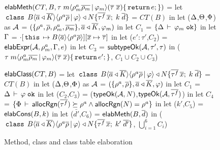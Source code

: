 \newcommand{\hdOf}[2]{\C{class}\; #1\angAlpha\inang{\rhoalloc\rhobar \,|\, #2} \extends \fbN}
\begin{figure}

\begin{codeml}
${\sf elabMeth}(CT, B, \tau \; m\langle \rho^a_m\overline{\rho_m} \,|\, \varphi_m \rangle (\overline{\tau} \; \overline{x})\{\,{\tt return}\, e;\})$ = 
  let $\hdOf{B}{\varphi}\{\bar{\tau^f}\,\xbar;\;k\;\bar{d}\}$ = $CT(B)$ in
  let ($\Delta$,$\Theta$,$\Phi$) as ${\mathcal{A}}$ = $(\{\rho^a,\overline{\rho},\rho^a_m,\overline{\rho_m}\},\overline{a} \triangleleft \overline{K},\varphi_m)$ in
  let $C_1$ = $\{\Delta\,\vdash\,\varphi_m \; \texttt{ok}\}$ in
  let $\Gamma$ = $\cdot[\,{\tt this}\, \mapsto B\langle \overline{a} \rangle\langle \rho^a\overline{\rho} \rangle][\overline{x} \mapsto \overline{\tau}]$ in
  let ($e':\tau'$,$C_2$) = ${\sf elabExpr} ({\mathcal{A}},\rho^a_m,\Gamma,e)$ in
  let $C_3$ = ${\sf subtypeOk}({{\mathcal{A}}},{\tau'},{\tau})$ in
    ($\tau \; m\langle \rho^a_m\overline{\rho_m} \,|\, \varphi_m \rangle (\overline{\tau} \;
    \overline{x})\{\,{\tt return}\, e';\}$, $C_1 \cup C_2 \cup C_3$)
\end{codeml}

\begin{codeml}
${\sf elabClass}(CT,B)$ = 
  let $\hdOf{B}{\varphi}\{\bar{\tau^f}\,\xbar;\;k\;\bar{d}\}$ = $CT(B)$ in
  let ($\Delta$,$\Theta$,$\Phi$) as ${\mathcal{A}}$ = $(\{\rho^a,\overline{\rho}\},\overline{a} \triangleleft \overline{K},\varphi)$ in
  let $C_1$ = $\Delta\,\vdash\,\varphi \; \texttt{ok}$ in
  let ($C_2$,$C_3$) = (${\sf typeOk}({{\mathcal{A}}},{N})$,${\sf typeOk}({{\mathcal{A}}},{\overline{\tau^f}})$) in
  let $C_4$ = $\{\Phi\,\vdash\,{\sf allocRgn}(\overline{\tau^f}) \succeq \rho^a \wedge {\sf allocRgn}(N) = \rho^a\}$ in
  let ($k'$,$C_5$) = ${\sf elabCons}(B,k)$ in
  let ($\bar{d'}$,$C_6$) = ${\sf elabMeth}(B,\overline{d})$ in
    ($\hdOf{B}{\varphi}\{\bar{\tau^f}\,\xbar;\;k'\;\bar{d'}\}$, $\bigcup_{i=1}^6 C_i$)
\end{codeml}
%
%       

\caption{Method, class and class table elaboration}
\label{fig:fb-elabmeth}
\end{figure}
